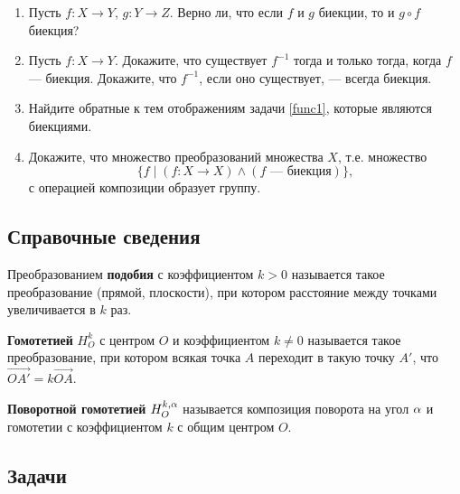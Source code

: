 \begin{enumerate}
\item Пусть $f: X \to Y$, $g:Y \to Z$. Верно ли, что если $f$ и $g$ биекции, то и $g \circ f$ биекция?

\item Пусть $f:X \to Y$. Докажите, что существует $f^{-1}$ тогда и только тогда, когда $f$ --- биекция.
Докажите, что $f^{-1}$, если оно существует, --- всегда биекция.

\item Найдите обратные к тем отображениям задачи \ref{func1}, которые являются биекциями.

\item Докажите, что множество преобразований множества $X$, т.е. множество
$$
\{f\mid (f:X\to X) \land (f\mbox{ --- биекция})\},
$$
с операцией композиции образует группу.

\end{enumerate}



\setcounter{chapter}{60}

\subsection*{Справочные сведения}

Преобразованием \textbf{подобия} с коэффициентом $k>0$ называется такое преобразование (прямой, плоскости), при котором расстояние между точками увеличивается в $k$ раз.

\textbf{Гомотетией} $H_O^k$ с центром $O$ и коэффициентом $k\ne 0$ называется такое преобразование, при котором всякая точка $A$ переходит в такую точку $A'$, что $\vec{OA'}=k\vec{OA}$.

\textbf{Поворотной гомотетией} $H_O^{k,\alpha}$ называется композиция поворота на угол $\alpha$ и гомотетии с коэффициентом $k$ с общим центром $O$.

\subsection*{Задачи}


